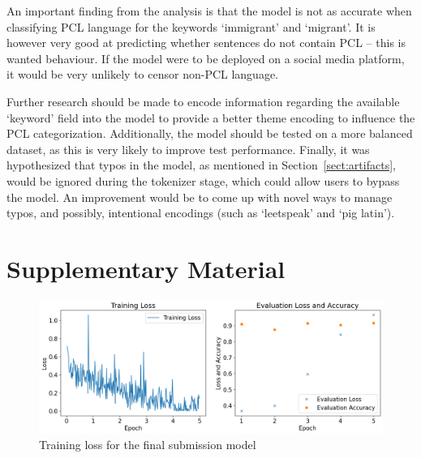 \documentclass[11pt,a4paper]{article}
\begin{document}
An important finding from the analysis is that the model is not as accurate when classifying PCL language for the keywords `immigrant' and `migrant'. It is however very good at predicting whether sentences do not contain PCL -- this is wanted behaviour. If the model were to be deployed on a social media platform, it would be very unlikely to censor non-PCL language.

Further research should be made to encode information regarding the available `keyword' field into the model to provide a better theme encoding to influence the PCL categorization. Additionally, the model should be tested on a more balanced dataset, as this is very likely to improve test performance. Finally, it was hypothesized that typos in the model, as mentioned in Section~\ref{sect:artifacts}, would be ignored during the tokenizer stage, which could allow users to bypass the model. An improvement would be to come up with novel ways to manage typos, and possibly, intentional encodings (such as `leetspeak' and `pig latin').




\appendix

\section{Supplementary Material}

\begin{figure}[H]
    \includegraphics[trim=0 0 15.5cm 0, clip, width=\linewidth]{figures/final-loss.png}
    \caption{Training loss for the final submission model}
    \label{fig:final-loss}
\end{figure}
\end{document}
